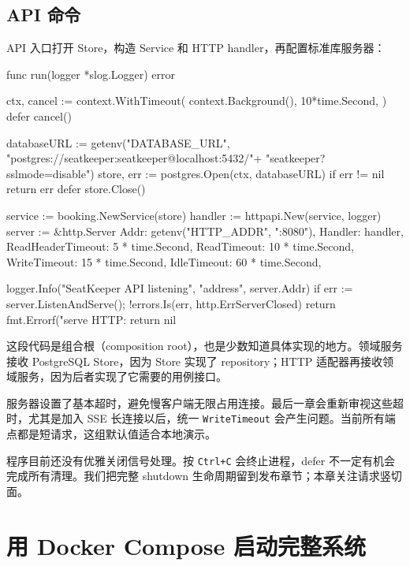 \subsection{API 命令}

API 入口打开 Store，构造 Service 和 HTTP handler，再配置标准库服务器：

\begin{gocode}[title={代码清单 12.46 \texttt{cmd/seatkeeper-api/main.go}：组装应用}]
func run(logger *slog.Logger) error {
    ctx, cancel := context.WithTimeout(
        context.Background(), 10*time.Second,
    )
    defer cancel()

    databaseURL := getenv("DATABASE_URL",
        "postgres://seatkeeper:seatkeeper@localhost:5432/"+
            "seatkeeper?sslmode=disable")
    store, err := postgres.Open(ctx, databaseURL)
    if err != nil {
        return err
    }
    defer store.Close()

    service := booking.NewService(store)
    handler := httpapi.New(service, logger)
    server := &http.Server{
        Addr:              getenv("HTTP_ADDR", ":8080"),
        Handler:           handler,
        ReadHeaderTimeout: 5 * time.Second,
        ReadTimeout:       10 * time.Second,
        WriteTimeout:      15 * time.Second,
        IdleTimeout:       60 * time.Second,
    }

    logger.Info("SeatKeeper API listening",
        "address", server.Addr)
    if err := server.ListenAndServe();
        !errors.Is(err, http.ErrServerClosed) {
        return fmt.Errorf("serve HTTP: %
    }
    return nil
}
\end{gocode}

这段代码是组合根（composition root），也是少数知道具体实现的地方。领域服务接收 PostgreSQL Store，因为 Store 实现了 repository；HTTP 适配器再接收领域服务，因为后者实现了它需要的用例接口。

服务器设置了基本超时，避免慢客户端无限占用连接。最后一章会重新审视这些超时，尤其是加入 SSE 长连接以后，统一 \texttt{WriteTimeout} 会产生问题。当前所有端点都是短请求，这组默认值适合本地演示。

程序目前还没有优雅关闭信号处理。按 \texttt{Ctrl+C} 会终止进程，defer 不一定有机会完成所有清理。我们把完整 shutdown 生命周期留到发布章节；本章关注请求竖切面。

\section{用 Docker Compose 启动完整系统}

